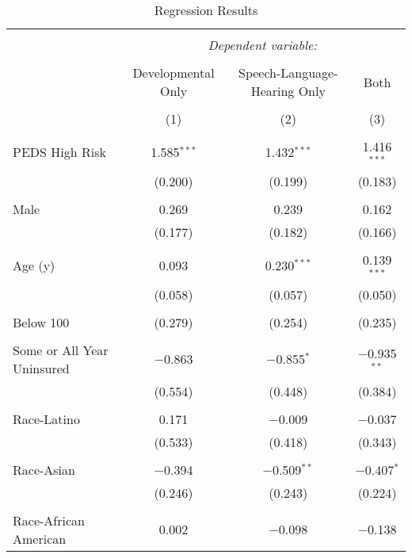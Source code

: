 \documentclass{article}
\begin{document}


\begin{table}[!htbp] \centering 
  \caption{Regression Results} 
  \label{} 
\begin{tabular}{@{\extracolsep{5pt}}lccc} 
\\[-1.8ex]\hline 
\hline \\[-1.8ex] 
 & \multicolumn{3}{c}{\textit{Dependent variable:}} \\ 
\cline{2-4} 
\\[-1.8ex] & Developmental Only & Speech-Language-Hearing Only & Both \\ 
\\[-1.8ex] & (1) & (2) & (3)\\ 
\hline \\[-1.8ex] 
 PEDS High Risk & 1.585$^{***}$ & 1.432$^{***}$ & 1.416$^{***}$ \\ 
  & (0.200) & (0.199) & (0.183) \\ 
  & & & \\ 
 Male & 0.269 & 0.239 & 0.162 \\ 
  & (0.177) & (0.182) & (0.166) \\ 
  & & & \\ 
 Age (y) & 0.093 & 0.230$^{***}$ & 0.139$^{***}$ \\ 
  & (0.058) & (0.057) & (0.050) \\ 
  & & & \\ 
 Below 100%
  & (0.279) & (0.254) & (0.235) \\ 
  & & & \\ 
 Some or All Year Uninsured & $-$0.863 & $-$0.855$^{*}$ & $-$0.935$^{**}$ \\ 
  & (0.554) & (0.448) & (0.384) \\ 
  & & & \\ 
 Race-Latino & 0.171 & $-$0.009 & $-$0.037 \\ 
  & (0.533) & (0.418) & (0.343) \\ 
  & & & \\ 
 Race-Asian & $-$0.394 & $-$0.509$^{**}$ & $-$0.407$^{*}$ \\ 
  & (0.246) & (0.243) & (0.224) \\ 
  & & & \\ 
 Race-African American & 0.002 & $-$0.098 & $-$0.138 \\ 

\end{tabular}
\end{table}
\end{document}
